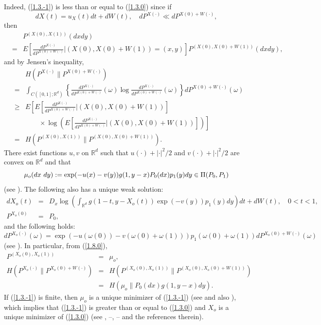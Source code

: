 \documentclass[12pt]{article}
\begin{document}
Indeed, (\ref{1.3.-1}) is less than or equal to (\ref{1.3.0}) since if 
$$dX(t)=u_X(t)dt +dW(t),\quad dP^{X(\cdot)}\ll dP^{X(0)+W(\cdot)},$$
then 
\begin{eqnarray}
&&P^{(X(0),X(1))}(dxdy)\label{1.8.0}\\
&=&E\left[\frac{dP^{X(\cdot)}}{dP^{X(0)+W(\cdot)}}\biggl|(X(0), X(0)+W(1))=(x,y)\right]
P^{(X(0), X(0)+W(1))}(dxdy),\nonumber
\end{eqnarray}
and by Jensen's inequality,
\begin{eqnarray*}
&&H(P^{X(\cdot)}\|P^{X(0)+W(\cdot)})\\
&=&\int_{C([0,1];\mathbb{R}^d)}\left\{\frac{dP^{X(\cdot)}}{dP^{X(0)+W(\cdot)}} (\omega)\log\frac{dP^{X(\cdot)}}{dP^{X(0)+W(\cdot)}} (\omega)\right\}dP^{X(0)+W(\cdot)}(\omega)\\
&\ge& E\left[E\left[\frac{dP^{X(\cdot)}}{dP^{X(0)+W(\cdot)}}\biggl|(X(0), X(0)+W(1))\right]\right.\\
&&\qquad \times \left.\log \left(E\left[\frac{dP^{X(\cdot)}}{dP^{X(0)+W(\cdot)}}\biggl|(X(0), X(0)+W(1))\right]\right)\right]\\
&=&H(P^{(X(0),X(1))}\|P^{(X(0), X(0)+W(1))}).
\end{eqnarray*}
There exist functions $u,v$ on $\mathbb{R}^d$ such that 
$u(\cdot)+|\cdot|^2/2$ and $v(\cdot)+|\cdot|^2/2$ are convex on $\mathbb{R}^d$
and that
$$\mu_o (dx\hbox{ }dy):=\exp (-u(x)-v(y))g(1,y-x)P_0(dx)p_1(y)dy\in \Pi(P_0,P_1)$$
(see \cite{1-Jamison1974}).
The following also has a unique weak solution:
\begin{eqnarray*}
dX_o(t)&=&D_x \log \left(\int_{\mathbb{R}^d}g(1-t, y-X_o(t))\exp (-v(y))p_1(y)dy\right)dt +dW(t),\quad 0<t<1,\\
P^{X_o(0)}&=&P_0,
\end{eqnarray*}
and the following holds:
$$dP^{X_o(\cdot)}(\omega)=\exp (-u(\omega(0))-v(\omega(0)+\omega(1)))p_1(\omega(0)+\omega(1)) dP^{X_o(0)+W(\cdot)}(\omega)$$
(see \cite{J75}).
In particular, from (\ref{1.8.0}),
\begin{eqnarray*}
P^{(X_o(0),X_o(1))}&=&\mu_o,\\
H(P^{X_o(\cdot)}\|P^{X_o(0)+W(\cdot)})
&=&H(P^{(X_o(0),X_o(1))}\|P^{(X_o(0), X_o(0)+W(1))})\\
&=&H(\mu_o\|P_0(dx)g(1,y-x)dy).
\end{eqnarray*}
If (\ref{1.3.-1}) is finite, then $\mu_o$ is  a unique minimizer of (\ref{1.3.-1})
(see \cite{1-Jamison1974, 1-RT} and also \cite{M2021}),
which implies that (\ref{1.3.-1}) is greater than or equal to (\ref{1.3.0}) and $X_o$ is a unique minimizer of (\ref{1.3.0})
(see \cite{D91, F88, J75},
\cite{M08}--\cite{MT06}, \cite{Z86}--\cite{Z86-3} and the references therein).
\end{document}

